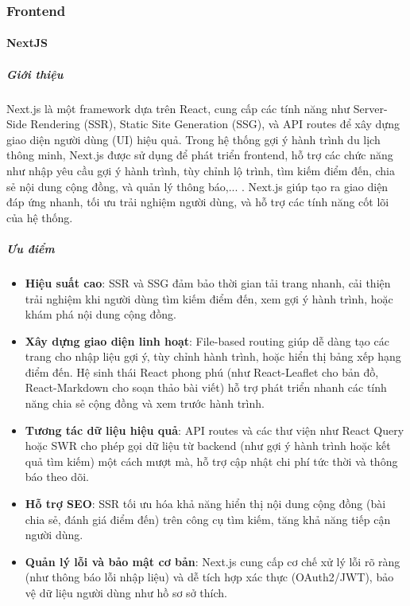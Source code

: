 \subsubsection{Frontend}
\paragraph{NextJS}

\subparagraph{Giới thiệu}
Next.js là một framework dựa trên React, cung cấp các tính năng như Server-Side Rendering (SSR), Static Site Generation (SSG), và API routes để xây dựng giao diện người dùng (UI) hiệu quả. Trong hệ thống gợi ý hành trình du lịch thông minh, Next.js được sử dụng để phát triển frontend, hỗ trợ các chức năng như nhập yêu cầu gợi ý hành trình, tùy chỉnh lộ trình, tìm kiếm điểm đến, chia sẻ nội dung cộng đồng, và quản lý thông báo,... . Next.js giúp tạo ra giao diện đáp ứng nhanh, tối ưu trải nghiệm người dùng, và hỗ trợ các tính năng cốt lõi của hệ thống.

\subparagraph{Ưu điểm}
\begin{itemize}
    \item \textbf{Hiệu suất cao}: SSR và SSG đảm bảo thời gian tải trang nhanh, cải thiện trải nghiệm khi người dùng tìm kiếm điểm đến, xem gợi ý hành trình, hoặc khám phá nội dung cộng đồng.
    \item \textbf{Xây dựng giao diện linh hoạt}: File-based routing giúp dễ dàng tạo các trang cho nhập liệu gợi ý, tùy chỉnh hành trình, hoặc hiển thị bảng xếp hạng điểm đến. Hệ sinh thái React phong phú (như React-Leaflet cho bản đồ, React-Markdown cho soạn thảo bài viết) hỗ trợ phát triển nhanh các tính năng chia sẻ cộng đồng và xem trước hành trình.
    \item \textbf{Tương tác dữ liệu hiệu quả}: API routes và các thư viện như React Query hoặc SWR cho phép gọi dữ liệu từ backend (như gợi ý hành trình hoặc kết quả tìm kiếm) một cách mượt mà, hỗ trợ cập nhật chi phí tức thời và thông báo theo dõi.
    \item \textbf{Hỗ trợ SEO}: SSR tối ưu hóa khả năng hiển thị nội dung cộng đồng (bài chia sẻ, đánh giá điểm đến) trên công cụ tìm kiếm, tăng khả năng tiếp cận người dùng.
    \item \textbf{Quản lý lỗi và bảo mật cơ bản}: Next.js cung cấp cơ chế xử lý lỗi rõ ràng (như thông báo lỗi nhập liệu) và dễ tích hợp xác thực (OAuth2/JWT), bảo vệ dữ liệu người dùng như hồ sơ sở thích.
\end{itemize}

